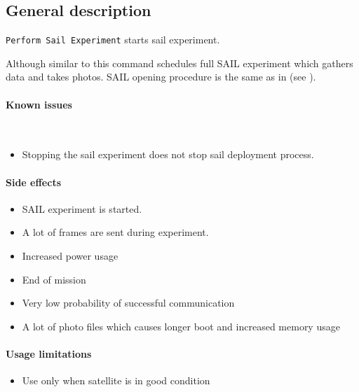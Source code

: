 

\subsection{General description}
\texttt{Perform Sail Experiment} starts sail experiment. 


Although similar to  this command schedules full SAIL experiment which gathers data and takes photos. SAIL opening procedure is the same as in  (see ).

\paragraph{Known issues} \mbox{} \\ 
\begin{itemize}
	\item Stopping the sail experiment does not stop sail deployment process.
\end{itemize}

\paragraph{Side effects}
\begin{itemize}
	\item SAIL experiment is started.
	\item A lot of frames are sent during experiment.
	\item Increased power usage
	\item End of mission
	\item Very low probability of successful communication
	\item A lot of photo files which causes longer boot and increased memory usage
\end{itemize}

\paragraph{Usage limitations}
\begin{itemize}
	\item Use only when satellite is in good condition
\end{itemize}

